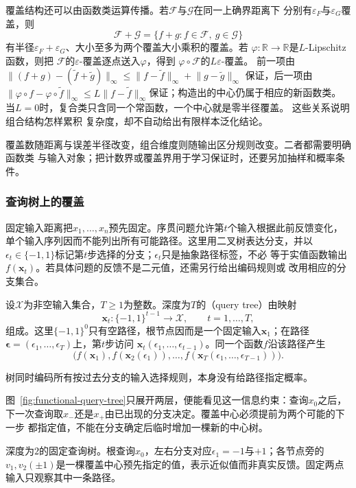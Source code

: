 覆盖结构还可以由函数类运算传播。若$\mathcal{F}$与$\mathcal{G}$在同一上确界距离下
分别有$\varepsilon_F$与$\varepsilon_G$覆盖，则
\[
  \mathcal{F}+\mathcal{G}
  =
  \{f+g:f\in\mathcal{F},\ g\in\mathcal{G}\}
\]
有半径$\varepsilon_F+\varepsilon_G$、大小至多为两个覆盖大小乘积的覆盖。若
$\varphi:\mathbb{R}\to\mathbb{R}$是$L$-Lipschitz函数，则把
$\mathcal{F}$的$\varepsilon$-覆盖逐点送入$\varphi$，得到
$\varphi\circ\mathcal{F}$的$L\varepsilon$-覆盖。
前一项由
$\lVert(f+g)-(\widetilde f+\widetilde g)\rVert_\infty
\leq\lVert f-\widetilde f\rVert_\infty+\lVert g-\widetilde g\rVert_\infty$
保证，后一项由
$\lVert\varphi\circ f-\varphi\circ\widetilde f\rVert_\infty
\leq L\lVert f-\widetilde f\rVert_\infty$保证；构造出的中心仍属于相应的新函数类。
当$L=0$时，复合类只含同一个常函数，一个中心就是零半径覆盖。
这些关系说明组合结构怎样累积
复杂度，却不自动给出有限样本泛化结论。

覆盖数随距离与误差半径改变，组合维度则随输出区分规则改变。二者都需要明确函数类
与输入对象；把计数界或覆盖界用于学习保证时，还要另加抽样和概率条件。

\subsubsection{查询树上的覆盖}
\label{sec:functional-sequential-classes-low-rank}

固定输入距离把$x_1,\ldots,x_n$预先固定。序贯问题允许第$t$个输入根据此前反馈变化，
单个输入序列因而不能列出所有可能路径。这里用二叉树表达分支，并以
$\epsilon_t\in\{-1,1\}$标记第$t$步选择的分支；$\epsilon_t$只是抽象路径标签，不必
等于实值函数输出$f(\bm{x}_t)$。若具体问题的反馈不是二元值，还需另行给出编码规则或
改用相应的分支集合。
\begin{definition}[二叉查询树]
\label{def:functional-query-tree}
设$\mathcal X$为非空输入集合，$T\geq1$为整数。深度为$T$的（query tree）由映射
\[
  \bm{x}_t:\{-1,1\}^{t-1}\to\mathcal{X},
  \qquad t=1,\ldots,T,
\]
组成。这里$\{-1,1\}^0$只有空路径，根节点因而是一个固定输入$\bm{x}_1$；在路径
$\bm{\epsilon}=(\epsilon_1,\ldots,\epsilon_T)$上，第$t$步访问
$\bm{x}_t(\epsilon_1,\ldots,\epsilon_{t-1})$。同一个函数$f$沿该路径产生
\[
  \bigl(
    f(\bm{x}_1),
    f(\bm{x}_2(\epsilon_1)),
    \ldots,
    f(\bm{x}_T(\epsilon_1,\ldots,\epsilon_{T-1}))
  \bigr).
\]
\end{definition}
树同时编码所有按过去分支的输入选择规则，本身没有给路径指定概率。

图~\ref{fig:functional-query-tree}只展开两层，便能看见这一信息约束：查询$x_0$之后，
下一次查询取$x_-$还是$x_+$由已出现的分支决定。覆盖中心必须提前为两个可能的下一步
都指定值，不能在分支确定后临时增加一棵新的中心树。
\begin{center}
\begin{minipage}{\linewidth}
 \centering
 
   {深度为$2$的固定查询树。根查询$x_0$，左右分支对应$\epsilon_1=-1$与$+1$；各节点旁的$v_1,v_2(\pm1)$是一棵覆盖中心预先指定的值，表示近似值而非真实反馈。固定两点输入只观察其中一条路径。}
\end{minipage}
\end{center}

